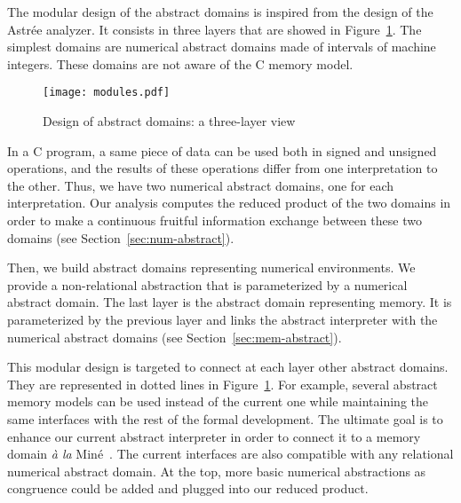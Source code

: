 The modular design of the
abstract domains is inspired from the design of the Astrée analyzer. It
consists in three layers that are showed in Figure~\ref{fig:couches}. 
The simplest domains are numerical abstract domains made of intervals
of machine integers. These domains are not aware of the C memory model.

\begin{figure}
  \centering
\texttt{[image: modules.pdf]}  
\caption{Design of abstract domains: a three-layer view \label{fig:couches}}
\end{figure}

In a C program, a same piece of data can be used both in signed and
unsigned operations, and the results of these operations differ from
one interpretation to the other.  Thus, we have two numerical abstract
domains, one for each interpretation.  Our analysis computes the
reduced product of the two domains in order to make a continuous
fruitful information exchange between these two domains (see Section~\ref{sec:num-abstract}).

Then, we build abstract domains representing numerical environments.
We provide a non-relational abstraction that is parameterized by a numerical abstract domain.
The last layer is the abstract domain representing memory. It is
parameterized by the previous layer and links
the abstract interpreter with the numerical abstract domains (see Section~\ref{sec:mem-abstract}). 

This modular design is targeted to connect at each layer other
abstract domains.  They are represented in dotted lines in
Figure~\ref{fig:couches}.  For example, several abstract memory models
can be used instead of the current one while maintaining the same
interfaces with the rest of the formal development.  The ultimate goal
is to enhance our current abstract interpreter in order to connect it to a memory
domain \emph{à la} Miné~\cite{mine-LCTES06}.  The current interfaces are
also compatible with any relational numerical abstract domain.  At
the top, more basic numerical abstractions as congruence could be
added and plugged into our reduced product.

